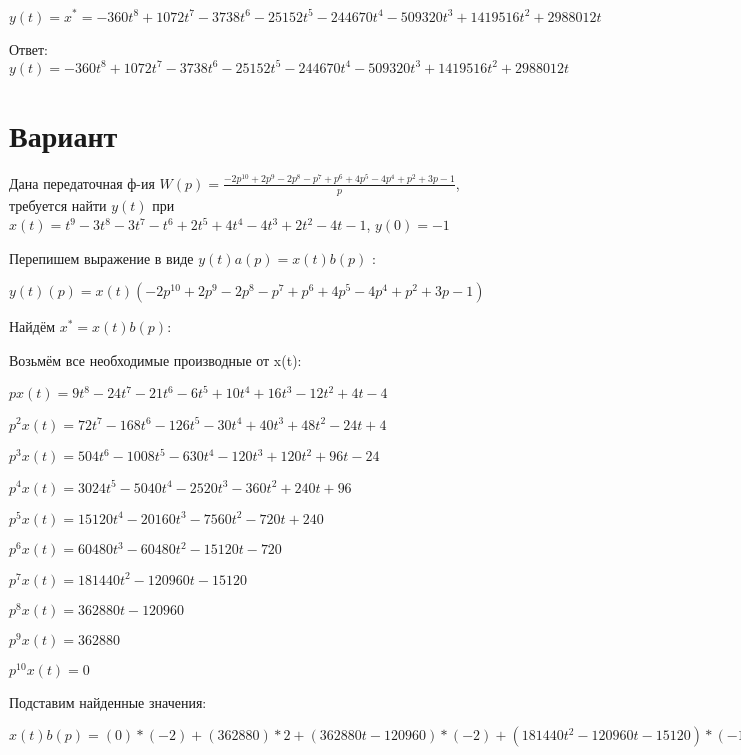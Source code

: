 \documentclass{article}
\begin{document}
{{$y(t)=x^*=-360t^{8}+1072t^{7}-3738t^{6}-25152t^{5}-244670t^{4}-509320t^{3}+1419516t^{2}+2988012t$

Ответ: $y(t) = -360t^{8}+1072t^{7}-3738t^{6}-25152t^{5}-244670t^{4}-509320t^{3}+1419516t^{2}+2988012t$

\section{Вариант}

Дана передаточная ф-ия $W(p)=\frac{-2p^{10}+2p^{9}-2p^{8}-p^{7}+p^{6}+4p^{5}-4p^{4}+p^{2}+3p-1}{p}$, требуется найти $y(t)$ при $x(t)=t^{9}-3t^{8}-3t^{7}-t^{6}+2t^{5}+4t^{4}-4t^{3}+2t^{2}-4t-1$, $y(0)=-1$

Перепишем выражение в виде $y(t)a(p)=x(t)b(p)$ :

$y(t)(p)=x(t)(-2p^{10}+2p^{9}-2p^{8}-p^{7}+p^{6}+4p^{5}-4p^{4}+p^{2}+3p-1)$

Найдём $x^*=x(t)b(p)$:

Возьмём все необходимые производные от x(t):

$px(t)=9t^{8}-24t^{7}-21t^{6}-6t^{5}+10t^{4}+16t^{3}-12t^{2}+4t-4$

$p^2x(t)=72t^{7}-168t^{6}-126t^{5}-30t^{4}+40t^{3}+48t^{2}-24t+4$

$p^3x(t)=504t^{6}-1008t^{5}-630t^{4}-120t^{3}+120t^{2}+96t-24$

$p^4x(t)=3024t^{5}-5040t^{4}-2520t^{3}-360t^{2}+240t+96$

$p^5x(t)=15120t^{4}-20160t^{3}-7560t^{2}-720t+240$

$p^6x(t)=60480t^{3}-60480t^{2}-15120t-720$

$p^7x(t)=181440t^{2}-120960t-15120$

$p^8x(t)=362880t-120960$

$p^9x(t)=362880$

$p^10x(t)=0$

Подставим найденные значения:

$x(t)b(p) = (0)*(-2)+(362880)*2+(362880t-120960)*(-2)+(181440t^{2}-120960t-15120)*(-1)+(60480t^{3}-60480t^{2}-15120t-720)*1+(15120t^{4}-20160t^{3}-7560t^{2}-720t+240)*4+(3024t^{5}-5040t^{4}-2520t^{3}-360t^{2}+240t+96)*(-4)+(72t^{7}-168t^{6}-126t^{5}-30t^{4}+40t^{3}+48t^{2}-24t+4)*1+(9t^{8}-24t^{7}-21t^{6}-6t^{5}+10t^{4}+16t^{3}-12t^{2}+4t-4)*3+(9t^{8}-24t^{7}-21t^{6}-6t^{5}+10t^{4}+16t^{3}-12t^{2}+4t-4)*(-1)=18t^{8}+24t^{7}-210t^{6}-12234t^{5}+80630t^{4}-10008t^{3}-270696t^{2}-623776t$





}}
\end{document}
